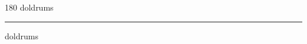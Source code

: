 
\begin{frame}
\begin{center}
\begin{turn}{180}
{\fontsize{2.5cm}{1em}\selectfont doldrums}
\end{turn}
\vspace{1em}\par  
\hrule
\vspace{1em}\par  
{\fontsize{2.5cm}{1em}\selectfont doldrums}
\end{center}
\end{frame}
